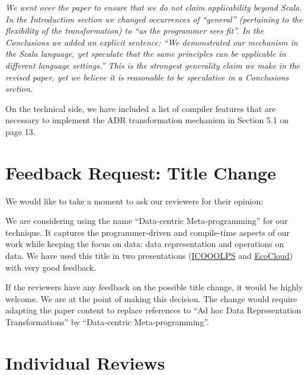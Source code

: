 \documentclass[9pt]{article}
\newenvironment{answer}
{ \em \framebox{{\bf AUTHOR RESPONSE}} }
{  }
\begin{document}
\begin{answer}
We went over the paper to ensure that we do not claim applicability beyond Scala. In the Introduction section we changed occurrences of ``general'' (pertaining to the flexibility of the transformation) to ``as the programmer sees fit''. In the Conclusions we added an explicit sentence: ``We demonstrated our mechanism in the Scala language, yet speculate that the same principles can be applicable in different language settings.'' This is the strongest generality claim we make in the revised paper, yet we believe it is reasonable to be speculative in a Conclusions section.

On the technical side, we have included a list of compiler features that are necessary to implement the ADR transformation mechanism in Section 5.1 on page 13.
\end{answer}

\newpage
\section{Feedback Request: Title Change}

We would like to take a moment to ask our reviewers for their opinion:

We are considering using the name ``Data-centric Meta-programming'' for our technique. It captures the programmer-driven and compile-time aspects of our work while keeping the focus on data: data representation and operations on data. We have used this title in two presentations (\href{https://speakerdeck.com/vladureche/data-centric-metaprogramming-at-icooolps-2015}{ICOOOLPS} and \href{https://speakerdeck.com/vladureche/data-centric-metaprogramming-at-ecocloud-2015}{EcoCloud}) with very good feedback.

If the reviewers have any feedback on the possible title change, it would be highly welcome. We are at the point of making this decision. The change would require adapting the paper content to replace references to ``Ad hoc Data Representation Transformations'' by ``Data-centric Meta-programming''.











\newpage

\section{Individual Reviews}
\end{document}
